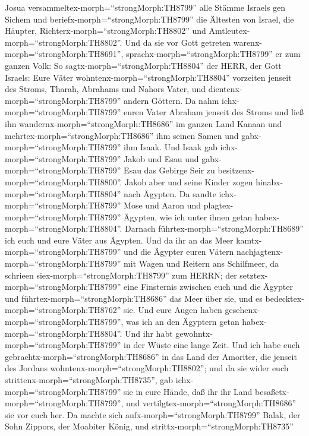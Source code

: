  Josua versammeltex-morph=``strongMorph:TH8799'' alle Stämme
Israels gen Sichem und beriefx-morph=``strongMorph:TH8799'' die Ältesten
von Israel, die Häupter, Richterx-morph=``strongMorph:TH8802'' und
Amtleutex-morph=``strongMorph:TH8802''. Und da sie vor Gott getreten
warenx-morph=``strongMorph:TH8691'', 
sprachx-morph=``strongMorph:TH8799'' er zum ganzen Volk: So
sagtx-morph=``strongMorph:TH8804'' der HERR, der Gott Israels: Eure
Väter wohntenx-morph=``strongMorph:TH8804'' vorzeiten jenseit des
Stroms, Tharah, Abrahams und Nahors Vater, und
dientenx-morph=``strongMorph:TH8799'' andern Göttern.  Da
nahm ichx-morph=``strongMorph:TH8799'' euren Vater Abraham jenseit des
Stroms und ließ ihn wandernx-morph=``strongMorph:TH8686'' im ganzen Land
Kanaan und mehrtex-morph=``strongMorph:TH8686'' ihm seinen Samen und
gabx-morph=``strongMorph:TH8799'' ihm Isaak.  Und Isaak gab
ichx-morph=``strongMorph:TH8799'' Jakob und Esau und
gabx-morph=``strongMorph:TH8799'' Esau das Gebirge Seir zu
besitzenx-morph=``strongMorph:TH8800''. Jakob aber und seine Kinder
zogen hinabx-morph=``strongMorph:TH8804'' nach Ägypten.  Da
sandte ichx-morph=``strongMorph:TH8799'' Mose und Aaron und
plagtex-morph=``strongMorph:TH8799'' Ägypten, wie ich unter ihnen getan
habex-morph=``strongMorph:TH8804''.  Darnach
führtex-morph=``strongMorph:TH8689'' ich euch und eure Väter aus
Ägypten. Und da ihr an das Meer kamtx-morph=``strongMorph:TH8799'' und
die Ägypter euren Vätern nachjagtenx-morph=``strongMorph:TH8799'' mit
Wagen und Reitern ans Schilfmeer,  da schrieen
siex-morph=``strongMorph:TH8799'' zum HERRN; der
setztex-morph=``strongMorph:TH8799'' eine Finsternis zwischen euch und
die Ägypter und führtex-morph=``strongMorph:TH8686'' das Meer über sie,
und es bedecktex-morph=``strongMorph:TH8762'' sie. Und eure Augen haben
gesehenx-morph=``strongMorph:TH8799'', was ich an den Ägyptern getan
habex-morph=``strongMorph:TH8804''. Und ihr habt
gewohntx-morph=``strongMorph:TH8799'' in der Wüste eine lange Zeit.
 Und ich habe euch gebrachtx-morph=``strongMorph:TH8686'' in
das Land der Amoriter, die jenseit des Jordans
wohntenx-morph=``strongMorph:TH8802''; und da sie wider euch
strittenx-morph=``strongMorph:TH8735'', gab
ichx-morph=``strongMorph:TH8799'' sie in eure Hände, daß ihr ihr Land
besaßetx-morph=``strongMorph:TH8799'', und
vertilgtex-morph=``strongMorph:TH8686'' sie vor euch her. 
Da machte sich aufx-morph=``strongMorph:TH8799'' Balak, der Sohn
Zippors, der Moabiter König, und strittx-morph=``strongMorph:TH8735''
